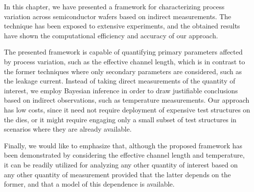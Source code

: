 In this chapter, we have presented a framework for characterizing process
variation across semiconductor wafers based on indirect measurements. The
technique has been exposed to extensive experiments, and the obtained results
have shown the computational efficiency and accuracy of our approach.

The presented framework is capable of quantifying primary parameters affected by
process variation, such as the effective channel length, which is in contrast to
the former techniques where only secondary parameters are considered, such as
the leakage current. Instead of taking direct measurements of the quantity of
interest, we employ Bayesian inference in order to draw justifiable conclusions
based on indirect observations, such as temperature measurements. Our approach
has low costs, since it need not require deployment of expensive test structures
on the dies, or it might require engaging only a small subset of test structures
in scenarios where they are already available.

Finally, we would like to emphasize that, although the proposed framework has
been demonstrated by considering the effective channel length and temperature,
it can be readily utilized for analyzing any other quantity of interest based on
any other quantity of measurement provided that the latter depends on the
former, and that a model of this dependence is available.
